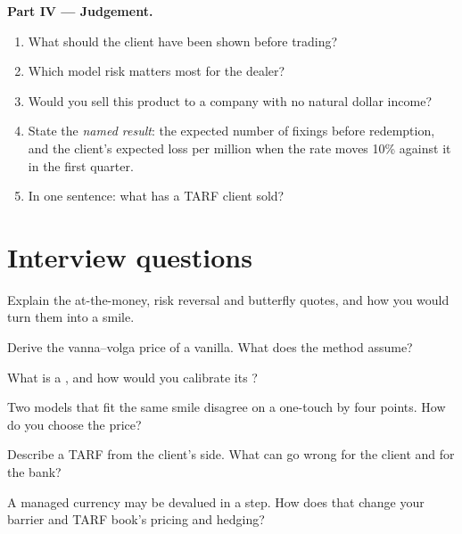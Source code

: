 \begin{problem}
\medskip\noindent\textbf{Part IV --- Judgement.}
\begin{enumerate}[resume]
\item What should the client have been shown before trading?
\item Which model risk matters most for the dealer?
\item Would you sell this product to a company with no natural dollar income?
\item State the \emph{named result}: the expected number of fixings before redemption, and the client's expected loss per million when the rate moves
10\% against it in the first quarter.
\item In one sentence: what has a TARF client sold?
\end{enumerate}
\end{problem}

\section{Interview questions}

\begin{interviewq}\label{iq:dv:fx-derivatives:1}
Explain the at-the-money, risk reversal and butterfly quotes, and how you would turn them into a smile.
\end{interviewq}

\begin{interviewq}\label{iq:dv:fx-derivatives:2}
Derive the vanna--volga price of a vanilla. What does the method assume?
\end{interviewq}

\begin{interviewq}\label{iq:dv:fx-derivatives:3}
What is a , and how would you calibrate its ?
\end{interviewq}

\begin{interviewq}\label{iq:dv:fx-derivatives:4}
Two models that fit the same smile disagree on a one-touch by four points. How do you choose the price?
\end{interviewq}

\begin{interviewq}\label{iq:dv:fx-derivatives:5}
Describe a TARF from the client's side. What can go wrong for the client and for the bank?
\end{interviewq}

\begin{interviewq}\label{iq:dv:fx-derivatives:6}
A managed currency may be devalued in a step. How does that change your barrier and TARF book's pricing and hedging?
\end{interviewq}
